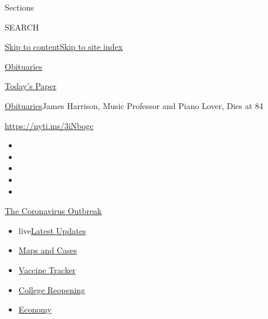 Sections

SEARCH

\protect\hyperlink{site-content}{Skip to
content}\protect\hyperlink{site-index}{Skip to site index}

\href{https://www.nytimes.com/section/obituaries}{Obituaries}

\href{https://myaccount.nytimes.com/auth/login?response_type=cookie\&client_id=vi}{}

\href{https://www.nytimes.com/section/todayspaper}{Today's Paper}

\href{/section/obituaries}{Obituaries}\textbar{}James Harrison, Music
Professor and Piano Lover, Dies at 84

\url{https://nyti.ms/3iNbogc}

\begin{itemize}
\item
\item
\item
\item
\item
\end{itemize}

\href{https://www.nytimes.com/news-event/coronavirus?action=click\&pgtype=Article\&state=default\&region=TOP_BANNER\&context=storylines_menu}{The
Coronavirus Outbreak}

\begin{itemize}
\tightlist
\item
  live\href{https://www.nytimes.com/2020/08/03/world/coronavirus-covid-19.html?action=click\&pgtype=Article\&state=default\&region=TOP_BANNER\&context=storylines_menu}{Latest
  Updates}
\item
  \href{https://www.nytimes.com/interactive/2020/us/coronavirus-us-cases.html?action=click\&pgtype=Article\&state=default\&region=TOP_BANNER\&context=storylines_menu}{Maps
  and Cases}
\item
  \href{https://www.nytimes.com/interactive/2020/science/coronavirus-vaccine-tracker.html?action=click\&pgtype=Article\&state=default\&region=TOP_BANNER\&context=storylines_menu}{Vaccine
  Tracker}
\item
  \href{https://www.nytimes.com/2020/08/02/us/covid-college-reopening.html?action=click\&pgtype=Article\&state=default\&region=TOP_BANNER\&context=storylines_menu}{College
  Reopening}
\item
  \href{https://www.nytimes.com/live/2020/08/03/business/stock-market-today-coronavirus?action=click\&pgtype=Article\&state=default\&region=TOP_BANNER\&context=storylines_menu}{Economy}
\end{itemize}

